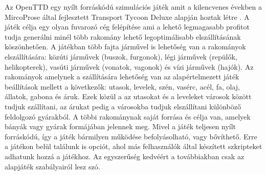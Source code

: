 

Az OpenTTD egy nyílt forráskódú szimulációs játék amit a kilencvenes években a MircoProse által fejlesztett Transport Tycoon Deluxe alapján hoztak létre \cite{openttd}. A játék célja egy olyan fuvarozó cég felépítése ami a lehető legmagasabb profitot tudja generálni minél több rakomány lehető legoptimálisabb elszállításának köszönhetően. A játékban több fajta járművel is lehetőség van a rakományok elszállítására: közúti járművek (buszok, furgonok), légi járművek (repülők, helikopterek), vasúti járművek (vonatok, vagonok) és vízi járművek (hajók). Az rakományok amelynek a szállítására lehetőség van az alapértelmezett játék beállítások mellett a következők: utasok, levelek, szén, vasérc, acél, fa, olaj, állatok, gabona és áruk. Ezek közül a az utasokat és a leveleket városok között tudjuk szállítani, az árukat pedig a városokba tudjuk elszállítani különböző feldolgozó gyárakból. A többi rakománynak saját forrása és célja van, amelyek bányák vagy gyárak formájában jelennek meg. Mivel a játék teljesen nyílt forráskódú, így a játék bármilyen működése befolyásolható, vagy bővíthető. Erre a játékon belül találunk is opciót, ahol más felhasználók által készített szkripteket adhatunk hozzá a játékhoz. Az egyszerűség kedvéért a továbbiakban csak az alapjáték szabályairól lesz szó.

